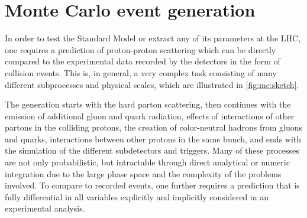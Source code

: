 \chapter{Monte Carlo event generation}
\label{ch:mc}


In order to test the Standard Model or extract any of its parameters at the LHC, one requires a prediction of proton-proton scattering which can be directly compared to the experimental data recorded by the detectors in the form of collision events. This is, in general, a very complex task consisting of many different subprocesses and physical scales, which are illustrated in \cref{fig:mc:sketch}. 

The generation starts with the hard parton scattering, then continues with the emission of additional gluon and quark radiation, effects of interactions of other partons in the colliding protons, the creation of color-neutral hadrons from gluons and quarks, interactions between other protons in the same bunch, and ends with the simulation of the different subdetectors and triggers. Many of these processes are not only probabilistic, but intractable through direct analytical or numeric integration due to the large phase space and the complexity of the problems involved. To compare to recorded events, one further requires a prediction that is fully differential in all variables explicitly and implicitly considered in an experimental analysis.

